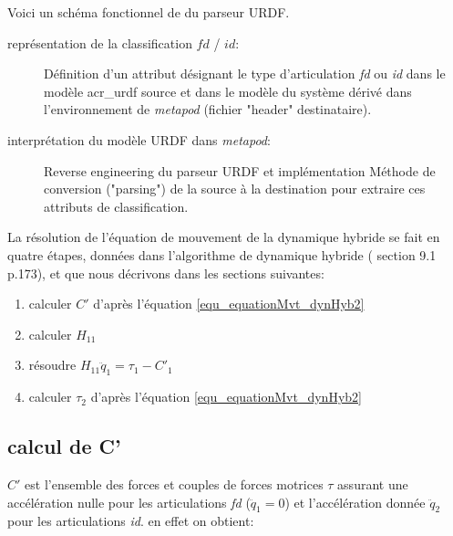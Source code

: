 \documentclass{report}
\begin{document}
Voici un schéma fonctionnel de du parseur URDF.


\begin{description}
\item[représentation de la classification $fd$ / $id$:] Définition d'un attribut désignant le type d'articulation \emph{fd} ou \emph{id} dans le modèle \gls{acr_urdf} source et dans le modèle du système dérivé dans l'environnement de \emph{metapod} (fichier "header" destinataire).
\item[interprétation du modèle URDF dans \emph{metapod}:] Reverse engineering du parseur URDF et implémentation Méthode de conversion ("parsing") de la source à la destination pour extraire ces attributs de classification.
\end{description}
\bigskip
La résolution de l'équation de mouvement de la dynamique hybride se fait en quatre étapes, données dans l'algorithme de dynamique hybride (\cite{bib_featherstone} section 9.1 p.173), et que nous décrivons dans les sections suivantes:
\begin{enumerate}
\item calculer $C'$ d'après l'équation \eqref{equ_equationMvt_dynHyb2}
\item calculer $H_{11}$
\item résoudre $H_{11} \ddot{q}_1 = \tau_1 - C'_1$
\item calculer $\tau_2$ d'après l'équation \eqref{equ_equationMvt_dynHyb2}
\end{enumerate}


\subsection{calcul de C'}

$C'$ est l'ensemble des forces et couples de forces motrices $\tau$ assurant une accélération nulle pour les articulations \emph{fd} ($\ddot{q}_1=0$) et l'accélération donnée $\ddot{q}_2$ pour les articulations \emph{id}. en effet on obtient:
\end{document}
